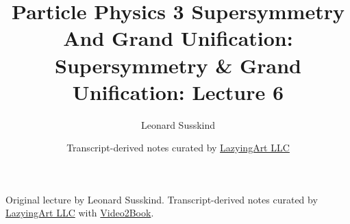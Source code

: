 \documentclass[11pt,oneside]{book}
\begin{document}
\frontmatter
\title{Particle Physics 3 Supersymmetry And Grand Unification: Supersymmetry \& Grand Unification: Lecture 6}
\author{Leonard Susskind}
\date{Transcript-derived notes curated by \href{https://lazying.art}{LazyingArt LLC}}
\maketitle
\begin{center}
\small Original lecture by Leonard Susskind. Transcript-derived notes curated by \href{https://lazying.art}{LazyingArt LLC} with \href{https://github.com/lachlanchen/Video2Book}{Video2Book}.
\end{center}
\clearpage
\mainmatter

\end{document}
